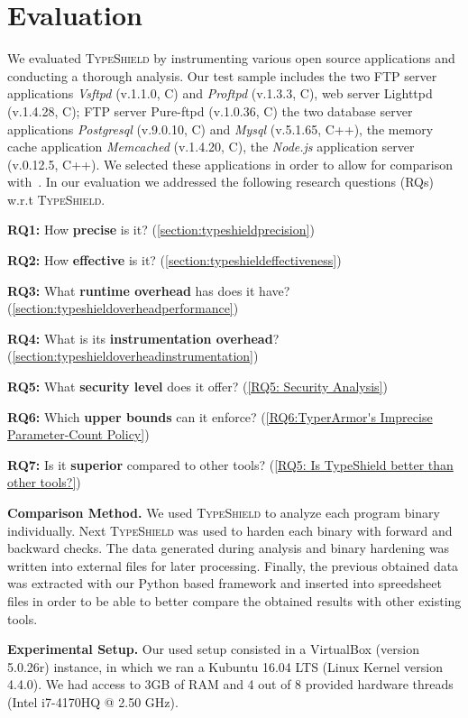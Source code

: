 \section{Evaluation}
\label{chapter:Evaluation}
We evaluated \textsc{TypeShield} by instrumenting various open source applications and conducting a thorough analysis. Our test sample includes the two 
FTP server applications \textit{Vsftpd} (v.1.1.0, C) and 
\textit{Proftpd} (v.1.3.3, C), 
web server Lighttpd (v.1.4.28, C); 
FTP server Pure-ftpd (v.1.0.36, C) 
the two database server applications 
\textit{Postgresql} (v.9.0.10, C) and 
\textit{Mysql} (v.5.1.65, C++), the memory cache application 
\textit{Memcached} (v.1.4.20, C), 
the \textit{Node.js} application server (v.0.12.5, C++). 
We selected these applications in order to allow for comparison with~\cite{veen:typearmor}. 
In our evaluation we addressed the following research questions (RQs) w.r.t \textsc{TypeShield}.

\textbf{RQ1:} How \textbf{precise} is it? (\cref{section:typeshieldprecision})

\textbf{RQ2:} How \textbf{effective} is it? (\cref{section:typeshieldeffectiveness})

\textbf{RQ3:} What \textbf{runtime overhead} has does it have? (\cref{section:typeshieldoverheadperformance})

\textbf{RQ4:} What is its \textbf{instrumentation overhead}? (\cref{section:typeshieldoverheadinstrumentation})

\textbf{RQ5:} What \textbf{security level} does it offer? (\cref{RQ5: Security Analysis})

\textbf{RQ6:} Which \textbf{upper bounds} can it enforce? (\cref{RQ6:TyperArmor's Imprecise Parameter-Count Policy})

\textbf{RQ7:} Is it \textbf{superior} compared to other tools? (\cref{RQ5: Is TypeShield better than other tools?})

\textbf{Comparison Method.} We used \textsc{TypeShield} to analyze each program binary individually. Next \textsc{TypeShield} was used to harden each binary with forward and 
backward checks. The data generated during analysis and binary hardening was written into external files for later processing. Finally, the previous obtained 
data was extracted with our Python based framework and inserted into spreedsheet files in order to be able to better compare the obtained 
results with other existing tools.

\textbf{Experimental Setup.} Our used setup consisted in a VirtualBox (version 5.0.26r) instance, in which we ran a Kubuntu 16.04 LTS (Linux Kernel
version 4.4.0). We had access to 3GB of RAM and 4 out of 8 provided hardware threads (Intel i7-4170HQ @ 2.50 GHz).


